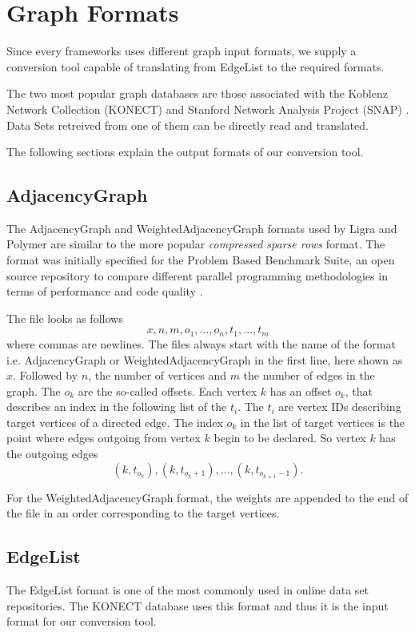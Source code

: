 
\section{Graph Formats}
Since every frameworks uses different graph input formats, we supply a conversion tool capable of translating from EdgeList to the required formats.

The two most popular graph databases are those associated with the Koblenz Network Collection (KONECT) \cite{konect} and Stanford Network Analysis Project (SNAP) \cite{snap}. Data Sets retreived from one of them can be directly read and translated.

The following sections explain the output formats of our conversion tool.
\subsection{AdjacencyGraph}
The AdjacencyGraph and WeightedAdjacencyGraph formats used by Ligra and Polymer are similar to the more popular \emph{compressed sparse rows} format.
The format was initially specified for the Problem Based Benchmark Suite, an open source repository to compare different parallel programming methodologies in terms of performance and code quality \cite{pbbs}.

The file looks as follows
\begin{equation*}
	x, n, m, o_1, \ldots, o_n, t_1, \ldots, t_m
\end{equation*}
where commas are newlines. The files always start with the name of the format i.e. AdjacencyGraph or WeightedAdjacencyGraph in the first line, here shown as $x$.
Followed by $n$, the number of vertices and $m$ the number of edges in the graph.
The $o_k$ are the so-called offsets. Each vertex $k$ has an offset $o_k$, that describes an index in the following list of the $t_i$.
The $t_i$ are vertex IDs describing target vertices of a directed edge.
The index $o_k$ in the list of target vertices is the point where edges outgoing from vertex $k$ begin to be declared. So vertex $k$ has the outgoing edges
\begin{equation*}
	(k, t_{o_k}), (k, t_{o_k+1}),\ldots, (k, t_{o_{k+1}-1}).
\end{equation*}

For the WeightedAdjacencyGraph format, the weights are appended to the end of the file in an order corresponding to the target vertices.


\subsection{EdgeList}
The EdgeList format is one of the most commonly used in online data set repositories. The KONECT database uses this format and thus it is the input format for our conversion tool.


